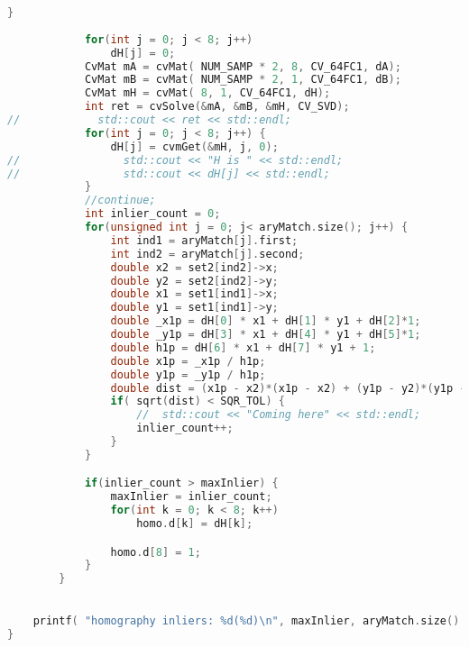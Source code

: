 \documentclass[11pt]{article}
\begin{document}
\begin{lstlisting}[language=C++, caption={RansacHomography}, label=code2]
            }
            
            for(int j = 0; j < 8; j++)
                dH[j] = 0;
            CvMat mA = cvMat( NUM_SAMP * 2, 8, CV_64FC1, dA);
            CvMat mB = cvMat( NUM_SAMP * 2, 1, CV_64FC1, dB);
            CvMat mH = cvMat( 8, 1, CV_64FC1, dH);
            int ret = cvSolve(&mA, &mB, &mH, CV_SVD);
//            std::cout << ret << std::endl;
            for(int j = 0; j < 8; j++) {
                dH[j] = cvmGet(&mH, j, 0);
//                std::cout << "H is " << std::endl;
//                std::cout << dH[j] << std::endl;
            }
            //continue;
            int inlier_count = 0;
            for(unsigned int j = 0; j< aryMatch.size(); j++) {
                int ind1 = aryMatch[j].first;
                int ind2 = aryMatch[j].second;
                double x2 = set2[ind2]->x;
                double y2 = set2[ind2]->y;
                double x1 = set1[ind1]->x;
                double y1 = set1[ind1]->y;
                double _x1p = dH[0] * x1 + dH[1] * y1 + dH[2]*1;
                double _y1p = dH[3] * x1 + dH[4] * y1 + dH[5]*1;
                double h1p = dH[6] * x1 + dH[7] * y1 + 1;
                double x1p = _x1p / h1p;
                double y1p = _y1p / h1p;
                double dist = (x1p - x2)*(x1p - x2) + (y1p - y2)*(y1p - y2);
                if( sqrt(dist) < SQR_TOL) {
                    //  std::cout << "Coming here" << std::endl;
                    inlier_count++;
                }
            }

            if(inlier_count > maxInlier) {
                maxInlier = inlier_count;
                for(int k = 0; k < 8; k++)
                    homo.d[k] = dH[k];

                homo.d[8] = 1;
            }
        }

        
	printf( "homography inliers: %d(%d)\n", maxInlier, aryMatch.size() );
}

\end{lstlisting}
\end{document}

